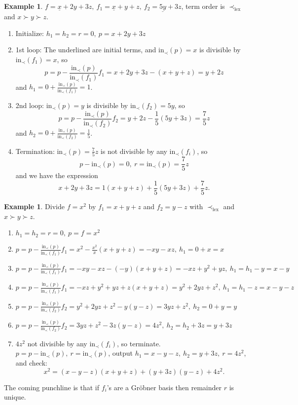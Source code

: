 \documentclass[a4paper]{article}
\newcommand{\In}{\text{in}}
\theoremstyle{definition}
\newtheorem{example}[defn]{Example}
\begin{document}
\begin{example}
$f=\underline{x}+2y+3z,\ f_1=\underline{x}+y+z,\ f_2=\underline{5y}+3z$, term order is $\prec_{\text{lex}}$ and $x\succ y\succ z$.
\begin{enumerate}
\item Initialize: $h_1=h_2=r=0,\ p=x+2y+3z$
\item 1st loop: The underlined are initial terms, and $\In_\prec(p)=x$ is divisible by $\In_\prec(f_1)=x$, so
\[
p=p-\frac{\In_\prec(p)}{\In_\prec(f_1)}f_1=x+2y+3z-(x+y+z)=y+2z
\]
and $h_1=0+\frac{\In_\prec(p)}{\In_\prec(f_1)}=1$.
\item 2nd loop: $\In_\prec(p)=y$ is divisible by $\In_\prec(f_2)=5y$, so
\[
p=p-\frac{\In_\prec(p)}{\In_\prec(f_2)}f_2=y+2z-\frac15 (5y+3z)=\frac75 z
\]
and $h_2=0+\frac{\In_\prec(p)}{\In_\prec(f_2)}=\frac15$.
\item Termination: $\In_\prec(p)=\frac75 z$ is not divisible by any $\In_\prec(f_i)$, so
\[
p-\In_\prec(p)=0,\ r=\In_\prec(p)=\frac75 z
\]
and we have the expression
\[
x+2y+3z=1(x+y+z)+\frac15 (5y+3z) + \frac75 z.
\]
\end{enumerate}
\end{example}
\begin{example}
Divide $f=x^2$ by $f_1=x+y+z$ and $f_2=y-z$ with $\prec_\text{lex}$ and $x\succ y\succ z$.
\begin{enumerate}
\item $h_1=h_2=r=0,\ p=f=x^2$
\item $p=p-\frac{\In_\prec(p)}{\In_\prec(f_1)}f_1=x^2-\frac{x^2}{x}(x+y+z)=-xy-xz,\ h_1=0+x=x$
\item $p=p-\frac{\In_\prec(p)}{\In_\prec(f_1)}f_1=-xy-xz-(-y)(x+y+z)=-xz+y^2+yz,\ h_1=h_1-y=x-y$
\item $p=p-\frac{\In_\prec(p)}{\In_\prec(f_1)}f_1=-xz+y^2+yz+z(x+y+z)=y^2+2yz+z^2,\ h_1=h_1-z=x-y-z$
\item $p=p-\frac{\In_\prec(p)}{\In_\prec(f_2)}f_2=y^2+2yz+z^2-y(y-z)=3yz+z^2,\ h_2=0+y=y$
\item $p=p-\frac{\In_\prec(p)}{\In_\prec(f_2)}f_2=3yz+z^2-3z(y-z)=4z^2,\ h_2=h_2+3z=y+3z$
\item $4z^2$ not divisible by any $\In_\prec(f_i)$, so terminate. $p=p-\In_\prec(p),\ r=\In_\prec(p)$, output $h_1=x-y-z,\ h_2=y+3z,\ r=4z^2$, and check:
\[
x^2=(x-y-z)(x+y+z)+(y+3z)(y-z)+4z^2.
\]
\end{enumerate}
\end{example}
The coming punchline is that if $f_i$'s are a Gröbner basis then remainder $r$ is unique.
\end{document}
